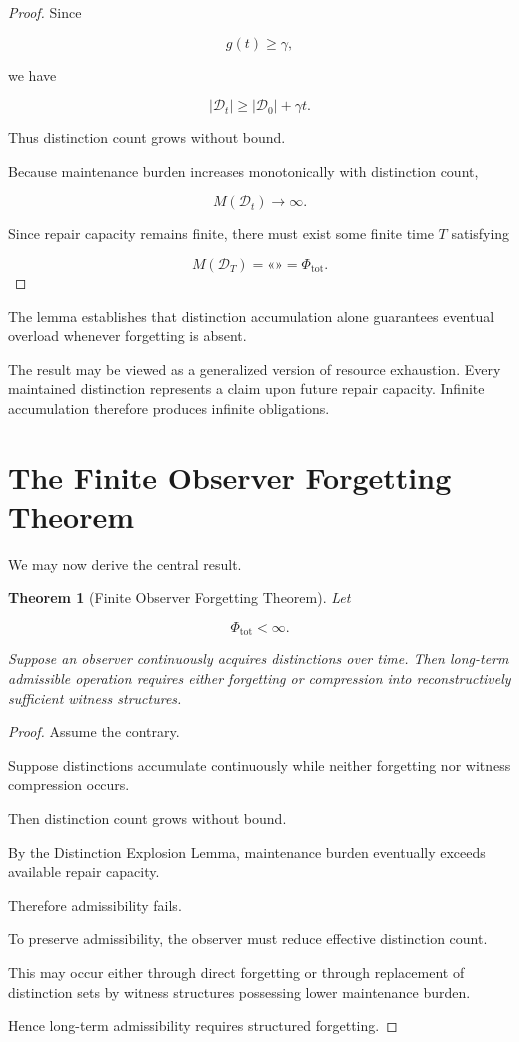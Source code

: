 \documentclass[12pt,oneside]{book}
\theoremstyle{plain} \newtheorem{theorem}{Theorem}[chapter] \newtheorem{lemma}[theorem]{Lemma} \newtheorem{proposition}[theorem]{Proposition} \newtheorem{corollary}[theorem]{Corollary}
\theoremstyle{definition} \newtheorem{definition}[theorem]{Definition} \newtheorem{axiom}[theorem]{Axiom} \newtheorem{construction}[theorem]{Construction}
\theoremstyle{remark} \newtheorem{remark}[theorem]{Remark} \newtheorem{example}[theorem]{Example}
\newcommand{\D}{\mathcal{D}} \newcommand{\R}{\mathcal{R}} \newcommand{\F}{\mathcal{F}} \newcommand{\U}{\mathcal{U}} \newcommand{\M}{\mathcal{M}} \newcommand{\G}{\Gamma}
\begin{document}
\begin{proof}

Since

\[
g(t)
\geq
\gamma,
\]

we have

\[
|\D_t|
\geq
|\D_0|
+
\gamma t.
\]

Thus distinction count grows without bound.

Because maintenance burden increases monotonically with distinction count,

\[
M(\D_t)
\rightarrow
\infty.
\]

Since repair capacity remains finite, there must exist some finite time $T$ satisfying

\[
M(\D_T)
=
«»
=
\Phi_{\mathrm{tot}}.
\]

\end{proof}

The lemma establishes that distinction accumulation alone guarantees eventual overload whenever forgetting is absent.

The result may be viewed as a generalized version of resource exhaustion. Every maintained distinction represents a claim upon future repair capacity. Infinite accumulation therefore produces infinite obligations.

\section{The Finite Observer Forgetting Theorem}

We may now derive the central result.

\begin{theorem}[Finite Observer Forgetting Theorem]

Let

\[
\Phi_{\mathrm{tot}}
<
\infty.
\]

Suppose an observer continuously acquires distinctions over time. Then long-term admissible operation requires either forgetting or compression into reconstructively sufficient witness structures.

\end{theorem}

\begin{proof}

Assume the contrary.

Suppose distinctions accumulate continuously while neither forgetting nor witness compression occurs.

Then distinction count grows without bound.

By the Distinction Explosion Lemma, maintenance burden eventually exceeds available repair capacity.

Therefore admissibility fails.

To preserve admissibility, the observer must reduce effective distinction count.

This may occur either through direct forgetting or through replacement of distinction sets by witness structures possessing lower maintenance burden.

Hence long-term admissibility requires structured forgetting.

\end{proof}
\end{document}
